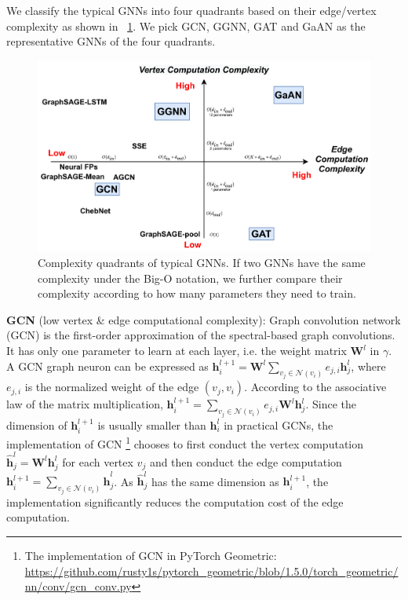 We classify the typical GNNs into four quadrants based on their edge/vertex complexity as shown in \figurename~\ref{fig:gnn_complexity_quadrant}. We pick GCN, GGNN, GAT and GaAN as the representative GNNs of the four quadrants.

\begin{figure}
	\centering
	\includegraphics[width=0.7\columnwidth]{figs/illustration/GNN_complexity_quadrant.png}
	\caption{Complexity quadrants of typical GNNs. If two GNNs have the same complexity under the Big-O notation, we further compare their complexity according to how many parameters they need to train.}
	\label{fig:gnn_complexity_quadrant}
\end{figure}

\textbf{GCN} \cite{kipf2017_gcn} (low vertex \& edge computational complexity): Graph convolution network (GCN) is the first-order approximation of the spectral-based graph convolutions.
It has only one parameter to learn at each layer, i.e. the weight matrix $\boldsymbol{W}^l$ in $\gamma$.
A GCN graph neuron can be expressed as $\boldsymbol{h}^{l+1}_i = \boldsymbol{W}^l\sum_{v_j \in \mathcal{N}(v_i)}{e_{j,i}\boldsymbol{h}^l_j}$, where $e_{j,i}$ is the normalized weight of the edge $(v_j, v_i)$.
According to the associative law of the matrix multiplication, $\boldsymbol{h}^{l+1}_i = \sum_{v_j \in \mathcal{N}(v_i)}{e_{j,i}\boldsymbol{W}^l\boldsymbol{h}^l_j}$.
Since the dimension of $\boldsymbol{h}^{l+1}_i$ is usually smaller than $\boldsymbol{h}^l_i$ in practical GCNs, the implementation of GCN \footnote{The implementation of GCN in PyTorch Geometric: \url{ https://github.com/rusty1s/pytorch_geometric/blob/1.5.0/torch_geometric/nn/conv/gcn_conv.py}} chooses to first conduct the vertex computation $\hat{\boldsymbol{h}}^l_j = \boldsymbol{W}^l\boldsymbol{h}^l_j$ for each vertex $v_j$ and then conduct the edge computation $\boldsymbol{h}^{l+1}_i=\sum_{v_j\in\mathcal{N}(v_i)}{\hat{\boldsymbol{h}}^l_j}$.
As $\hat{\boldsymbol{h}}^l_j$ has the same dimension as $\boldsymbol{h}^{l+1}_i$, the implementation significantly reduces the  computation cost of the edge computation.

